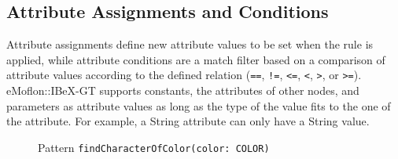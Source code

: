 \subsection{Attribute Assignments and Conditions}
Attribute assignments define new attribute values to be set when the rule is applied, 
while attribute conditions are a match filter based on a comparison of attribute values according to the defined relation (\texttt{==}, \texttt{!=}, \texttt{<=}, \texttt{<}, \texttt{>}, or \texttt{>=}).
eMoflon::IBeX-GT supports constants, the attributes of other nodes, and parameters as attribute values as long as the type of the value fits to the one of the attribute.
For example, a String attribute can only have a String value.

\begin{figure}[h!]
	\centering
	\quad
	\caption{Pattern \texttt{findCharacterOfColor(color: COLOR)}}
	\label{fig:pattern-findCharacterOfColor}
\end{figure}


